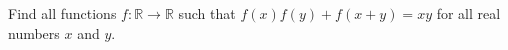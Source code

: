 \documentclass[varwidth]{standalone}
\begin{document}
    Find all functions $f: \mathbb{R} \to \mathbb{R}$ such that $f(x)f(y) + f(x + y) = xy$ for all real numbers $x$ and $y$.
\end{document}
